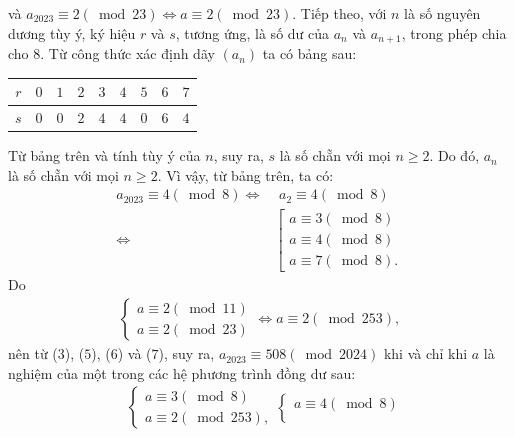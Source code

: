 \begin{multicols}{2}
	và ${a_{2023}} \equiv 2\left( {\bmod 23} \right) \Leftrightarrow a \equiv 2\left( {\bmod 23} \right).$       
	\vskip 0.05cm
	Tiếp theo, với $n$ là số nguyên dương tùy ý, ký hiệu $r$ và $s$, tương ứng, là số dư của $a_n$  và $a_{n+1}$, trong phép chia cho $8$.
	\vskip 0.05cm
	Từ công thức xác định dãy $\left(a_n\right)$  ta có bảng sau:
	\begin{center}
		\begin{tabular}{|c|c|c|c|c|c|c|c|c|}
			\hline
			$r$&	$0$&	$1$&	$2$&	$3$&	$4$&	$5$&	$6$&	$7$\\
			\hline
			$s$&	$0$&	$0$&	$2$&	$4$&	$4$&	$0$&	$6$&	$4$\\
			\hline
		\end{tabular}
	\end{center}
	Từ bảng trên và tính tùy ý của $n$, suy ra, $s$ là số chẵn với mọi $n \ge  2$. Do đó,  $a_n$ là số chẵn với mọi $n \ge  2$. Vì vậy, từ bảng trên, ta có:
	\begin{align*}
		{a_{2023}} \!\equiv \!4\left(\!\! {\bmod 8} \right)
		\Leftrightarrow \!&\,\,{a_2} \equiv\! 4\left(\!\!{\bmod 8} \right) \\
		\Leftrightarrow \!\!&\left[\!\!\! \begin{array}{l}
			\!a \!\equiv\! 3\left(\!\! {\bmod 8} \right)\\
			\!a \!\equiv\! 4\left(\!\! {\bmod 8} \right)\\
			\!a \!\equiv\! 7\left(\!\! {\bmod 8} \right).
		\end{array} \right. \!\!\tag{$7$}
	\end{align*}
	Do
	\begin{align*}
		\left\{ \begin{array}{l}
			a \equiv 2\left( {\bmod 11} \right)\\
			a \equiv 2\left( {\bmod 23} \right)
		\end{array} \right. \Leftrightarrow a \equiv 2\left( {\bmod 253} \right),
	\end{align*}
	nên từ ($3$), ($5$), ($6$) và ($7$), suy ra, ${a_{2023}} \equiv 508\left( {\bmod 2024} \right)$  khi và chỉ khi $a$ là nghiệm của một trong các hệ phương trình đồng dư sau:
	\begin{align*}
		&\begin{cases}
			a \equiv 3\left( {\bmod 8} \right)\\
			a \equiv 2\left( {\bmod 253} \right),
		\end{cases}
		\begin{cases}
			a \equiv 4\left( {\bmod 8} \right)\\

\end{cases}
\end{align*}
\end{multicols}
